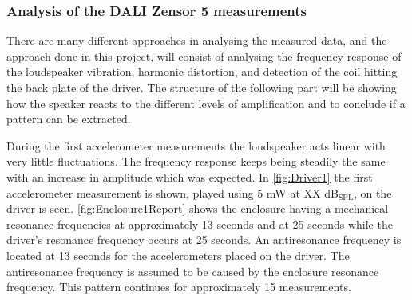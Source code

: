\subsubsection{Analysis of the DALI Zensor 5 measurements}

There are many different approaches in analysing the measured data, and the approach done in this project, will consist of analysing the frequency response of the loudspeaker vibration, harmonic distortion, and detection of the coil hitting the back plate of the driver. The structure of the following part will be showing how the speaker reacts to the different levels of amplification and to conclude if a pattern can be extracted.




During the first accelerometer measurements the loudspeaker acts linear with very little fluctuations. The frequency response keeps being steadily the same with an increase in amplitude which was expected. In \autoref{fig:Driver1} the first accelerometer measurement is shown, played using 5 mW at XX dB$_{\text{SPL}}$, on the driver is seen. \autoref{fig:Enclosure1Report} shows the enclosure having a mechanical resonance frequencies at approximately 13 seconds and at 25 seconds while the driver's resonance frequency occurs at 25 seconds. An antiresonance frequency is located at 13 seconds for the accelerometers placed on the driver. The antiresonance frequency is assumed to be caused by the enclosure resonance frequency. This pattern continues for approximately 15 measurements. 


